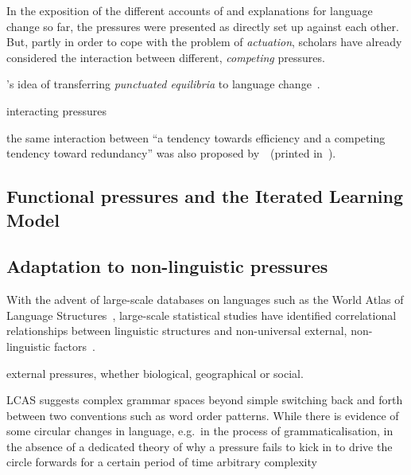In the exposition of the different accounts of and explanations for language change so far, the pressures were presented as directly set up against each other. But, partly in order to cope with the problem of \emph{actuation}, scholars have already considered the interaction between different, \emph{competing} pressures.

\citeauthor{Dixon1997}'s idea of transferring \emph{punctuated equilibria} to language change~\citeyearpar{Dixon1997}.
\citep{Thomsen2006}


interacting pressures~\citep{Smith2013,Winter2016}


the same interaction between ``a tendency towards efficiency and a competing tendency toward redundancy'' was also proposed by~\citet[p.155]{Greenberg1954}~(printed in~\citealt{Osgood1954}).

\subsection{Functional pressures and the Iterated Learning Model}\label{sec:ilm}


\subsection{Adaptation to non-linguistic pressures}

With the advent of large-scale databases on languages such as the World Atlas of Language Structures~\citep[WALS][]{WALS2013}, large-scale statistical studies have identified correlational relationships between linguistic structures and non-universal external, non-linguistic factors~\citep{Ladd2015}.

external pressures, whether biological, geographical or social.


\citep{Dediu2007}
\citep{Nettle201?}

\citep{Atkinson2016}


LCAS suggests complex grammar spaces beyond simple switching back and forth between two conventions such as word order patterns.
While there is evidence of some circular changes in language, e.g.~in the process of grammaticalisation, in the absence of a dedicated theory of why a pressure fails to kick in to drive the circle forwards for a certain period of time
arbitrary complexity

